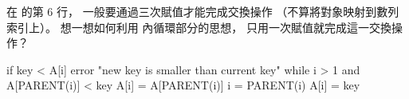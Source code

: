 \startEXERCISE
在  的第 6 行，
一般要通過三次賦值才能完成交換操作
（不算將對象映射到數列索引上）。
想一想如何利用  內循環部分的思想，
只用一次賦值就完成這一交換操作？
\stopEXERCISE

\startANSWER
{}
\startCLRSCODE
if key < A[i]
	error "new key is smaller than current key"
while i > 1 and A[PARENT(i)] < key
	A[i] = A[PARENT(i)]
	i = PARENT(i)
A[i] = key
\stopCLRSCODE
\stopANSWER
